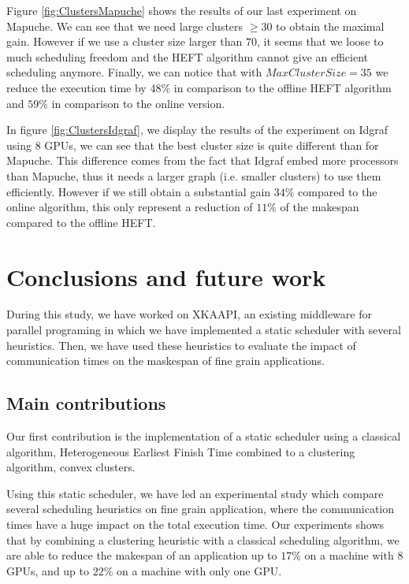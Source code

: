 \documentclass[10pt, conference, compsocconf,pdftex,dvipsnames]{IEEEtran}
\begin{document}
Figure \ref{fig:ClustersMapuche} shows the results of our last experiment on
Mapuche. We can see that we need large clusters $\geq 30$ to obtain the maximal
gain. However if we use a cluster size larger than $70$, it seems that we
loose to much scheduling freedom and the HEFT algorithm cannot give an efficient
scheduling anymore. Finally, we can notice that with $MaxClusterSize=35$ we
reduce the execution time by $48\%$ in comparison to the offline HEFT
algorithm and $59\%$ in comparison to the online version.

In figure \ref{fig:ClustersIdgraf}, we display the results of the experiment
on Idgraf using $8$ GPUs, we can see that the best cluster size is quite
different than for Mapuche. This difference comes from the fact that Idgraf
embed more processors than Mapuche, thus it needs a larger graph (i.e.
smaller clusters) to use them efficiently. However if we still obtain a
substantial gain $34\%$ compared to the online algorithm, this only represent
a reduction of $11\%$ of the makespan compared to the offline HEFT.  

\section{Conclusions and future work}
\label{sec:cncl}
During this study, we have worked on
XKAAPI\cite{gautier2007kaapi,gautierxkaapi}, an existing middleware for
parallel programing in which we have implemented a static scheduler with
several heuristics. Then, we have used these heuristics to evaluate the impact
of communication times on the maskespan of fine grain applications.

\subsection{Main contributions}
\label{chap:cncl-contrib}
Our first contribution is the implementation of a static scheduler using
a classical algorithm, Heterogeneous Earliest Finish Time combined to a
clustering algorithm, convex clusters. 

Using this static scheduler, we have led an experimental study which compare
several scheduling heuristics on fine grain application, where the
communication times have a huge impact on the total execution time.  Our
experiments shows that by combining a clustering heuristic with a classical
scheduling algorithm, we are able to reduce the makespan of an application  up
to $17\%$ on a machine with $8$ GPUs, and up to $22\%$ on a machine with only
one GPU.
\end{document}

